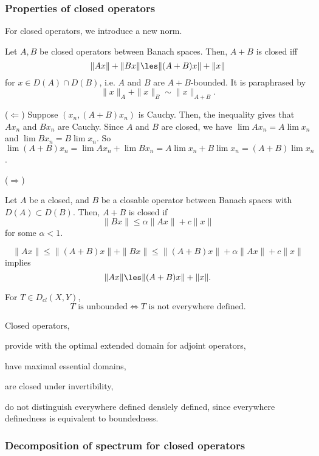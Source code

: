 \documentclass{../crs}
\begin{document}
\subsubsection{Properties of closed operators}
For closed operators, we introduce a new norm. 
\begin{thm}
Let $A,B$ be closed operators between Banach spaces.
Then, $A+B$ is closed iff
\[\|Ax\|+\|Bx\|\les\|(A+B)x\|+\|x\|\]
for $x\in D(A)\cap D(B)$, i.e. $A$ and $B$ are $A+B$-bounded.
It is paraphrased by
\[\|x\|_A+\|x\|_B\sim\|x\|_{A+B}.\]
\end{thm}
\begin{pf}
($\Leftarrow$) Suppose $(x_n,(A+B)x_n)$ is Cauchy.
Then, the inequality gives that $Ax_n$ and $Bx_n$ are Cauchy.
Since $A$ and $B$ are closed, we have $\lim Ax_n=A\lim x_n$ and $\lim Bx_n=B\lim x_n$.
So $\lim(A+B)x_n=\lim Ax_n+\lim Bx_n=A\lim x_n+B\lim x_n=(A+B)\lim x_n$.

($\Rightarrow$)
\end{pf}
\begin{thm}
Let $A$ be a closed, and $B$ be a closable operator between Banach spaces with $D(A)\subset D(B)$.
Then, $A+B$ is closed if
\[\|Bx\|\le\alpha\|Ax\|+c\|x\|\]
for some $\alpha<1$.
\end{thm}
\begin{pf}
\[\|Ax\|\le\|(A+B)x\|+\|Bx\|\le\|(A+B)x\|+\alpha\|Ax\|+c\|x\|\]
implies
\[\|Ax\|\les\|(A+B)x\|+\|x\|.\]

\end{pf}

\begin{prop}
For $T\in D_{cl}(X,Y)$,
\[T\text{ is unbounded}\iff T\text{ is not everywhere defined}.\]
\end{prop}

Closed operators,
\begin{cond}
\item provide with the optimal extended domain for adjoint operators,
\item have maximal essential domains,
\item are closed under invertibility,
\item do not distinguish everywhere defined denslely defined, since everywhere definedness is equivalent to boundedness.
\end{cond}


\subsubsection{Decomposition of spectrum for closed operators}
\end{document}
